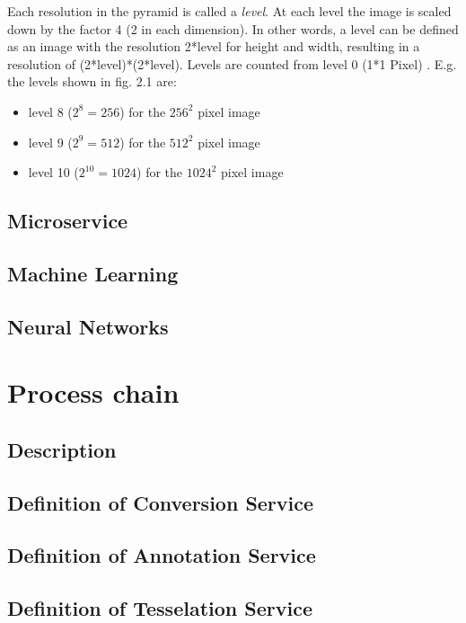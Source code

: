 Each resolution in the pyramid is called a \emph{level}. At each level the image is scaled down by the factor 4 (2 in each dimension). In other words, a level can be defined as an image with the resolution 2*level for height and width, resulting in a resolution of (2*level)*(2*level). Levels are counted from level 0 (1*1 Pixel) \cite{web:dzi}. E.g. the levels shown in fig. 2.1 are:
\begin{itemize}
	\item level 8 ($2^8=256$) for the $256^2$ pixel image
	\item level 9 ($2^9=512$) for the $512^2$ pixel image
	\item level 10 ($2^10=1024$) for the $1024^2$ pixel image
\end{itemize}

\subsection{Microservice}
\subsection{Machine Learning}
\subsection{Neural Networks}
\section{Process chain}
\subsection{Description}
\subsection{Definition of Conversion Service}
\subsection{Definition of Annotation Service}
\subsection{Definition of Tesselation Service}